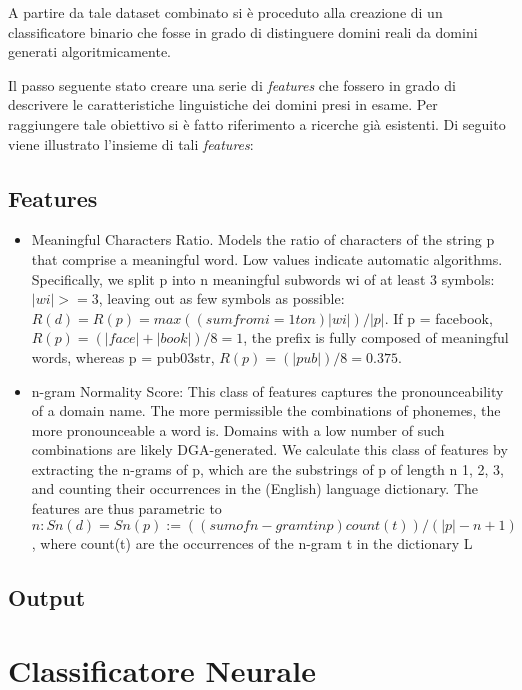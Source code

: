 A partire da tale dataset combinato si è proceduto alla creazione di un classificatore binario che fosse in grado di distinguere domini reali da domini generati algoritmicamente. 

Il passo seguente  stato creare una serie di \textit{features} che fossero in grado di descrivere le caratteristiche linguistiche dei domini presi in esame. Per raggiungere tale obiettivo si è fatto riferimento a ricerche già esistenti. Di seguito viene illustrato l'insieme di tali \textit{features}:

\subsection{Features}
\label{randomforestinterno}

\begin{itemize}
\item Meaningful Characters Ratio. Models the ratio of characters of the string p that comprise a meaningful word. Low values indicate automatic algorithms. Specifically, we split p into n meaningful subwords wi of at least 3 symbols: $|wi| >= 3$, leaving out as few symbols as possible: $R(d) = R(p) = max((sum from i=1 to n) |wi|)/|p|.$
    If p = facebook, $R(p) = (|face| + |book|)/8 = 1$, the prefix is fully composed of meaningful words, whereas p = pub03str, $R(p) = (|pub|)/8 = 0.375$.
    
\item n-gram Normality Score: This class of features captures the pronounceability of a domain name. The more permissible the combinations of phonemes, the more pronounceable a word is. Domains with a low number of such combinations are likely DGA-generated.
        We calculate this class of features by extracting the n-grams of p, which are the substrings of p of length n {1, 2, 3}, and counting their occurrences in the (English) language dictionary.
        The features are thus parametric to $n: Sn(d) = Sn(p) := ((sum of n-gram t in p) count(t))/(|p|-n+1)$, where count(t) are the occurrences of the n-gram t in the dictionary L
\end{itemize}



\subsection{Output}
\label{randomforestoutput}

\section{Classificatore Neurale}
\label{classificatorenn}

